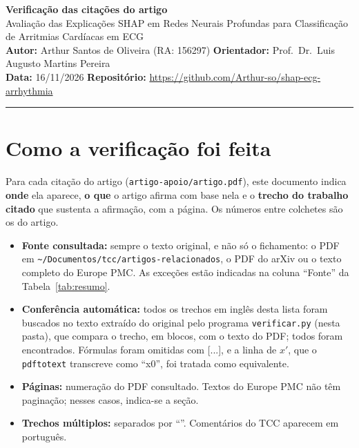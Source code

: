 \documentclass[11pt,a4paper]{article}
\begin{document}
\begin{center}
    {\LARGE \textbf{Verificação das citações do artigo}} \\[0.35em]
    {\large Avaliação das Explicações SHAP em Redes Neurais Profundas para Classificação de Arritmias Cardíacas em ECG} \\[0.3em]
    \textbf{Autor:} Arthur Santos de Oliveira (RA: 156297) \quad \textbf{Orientador:} Prof.\ Dr.\ Luis Augusto Martins Pereira \\[0.2em]
    \textbf{Data:} 16/11/2026 \quad \textbf{Repositório:} \url{https://github.com/Arthur-so/shap-ecg-arrhythmia}
\end{center}
\vspace{-0.5em}
\hrule
\vspace{0.8em}

\section{Como a verificação foi feita}
Para cada citação do artigo (\texttt{artigo-apoio/artigo.pdf}), este documento indica \textbf{onde} ela aparece, \textbf{o que} o artigo afirma com base nela e o \textbf{trecho do trabalho citado} que sustenta a afirmação, com a página. Os números entre colchetes são os do artigo.

\begin{itemize}
\item \textbf{Fonte consultada:} sempre o texto original, e não só o fichamento: o PDF em \texttt{\textasciitilde/Documentos/tcc/artigos-relacionados}, o PDF do arXiv ou o texto completo do Europe PMC. As exceções estão indicadas na coluna ``Fonte'' da Tabela~\ref{tab:resumo}.
\item \textbf{Conferência automática:} todos os trechos em inglês desta lista foram buscados no texto extraído do original pelo programa \texttt{verificar.py} (nesta pasta), que compara o trecho, em blocos, com o texto do PDF; todos foram encontrados. Fórmulas foram omitidas com [...], e a linha de $x'$, que o \texttt{pdftotext} transcreve como ``x0'', foi tratada como equivalente.
\item \textbf{Páginas:} numeração do PDF consultado. Textos do Europe PMC não têm paginação; nesses casos, indica-se a seção.
\item \textbf{Trechos múltiplos:} separados por ``\textbar\textbar''. Comentários do TCC aparecem em português.
\end{itemize}
\end{document}
